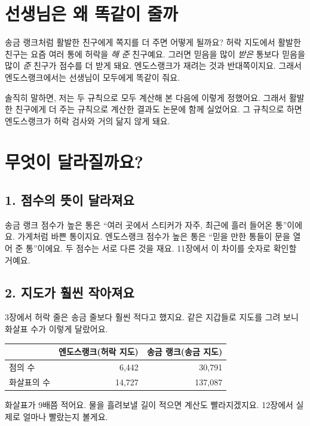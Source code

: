 \section{선생님은 왜 똑같이 줄까}

송금 랭크처럼 활발한 친구에게 쪽지를 더 주면 어떻게 될까요?
허락 지도에서 활발한 친구는 요즘 여러 통에 허락을 \emph{해 준} 친구예요.
그러면 믿음을 많이 \emph{받은} 통보다 믿음을 많이 \emph{준} 친구가 점수를 더 받게 돼요.
엔도스랭크가 재려는 것과 반대쪽이지요.
그래서 엔도스랭크에서는 선생님이 모두에게 똑같이 줘요.

솔직히 말하면, 저는 두 규칙으로 모두 계산해 본 다음에 이렇게 정했어요.
그래서 활발한 친구에게 더 주는 규칙으로 계산한 결과도 논문에 함께 실었어요.
그 규칙으로 하면 엔도스랭크가 허락 검사와 거의 닮지 않게 돼요.

\section{무엇이 달라질까요?}

\subsection*{1. 점수의 뜻이 달라져요}

송금 랭크 점수가 높은 통은 “여러 곳에서 스티커가 자주, 최근에 흘러 들어온 통”이에요.
가게처럼 바쁜 통이지요.
엔도스랭크 점수가 높은 통은 “믿을 만한 통들이 문을 열어 준 통”이에요.
두 점수는 서로 다른 것을 재요.
11장에서 이 차이를 숫자로 확인할 거예요.

\subsection*{2. 지도가 훨씬 작아져요}

3장에서 허락 줄은 송금 줄보다 훨씬 적다고 했지요.
같은 지갑들로 지도를 그려 보니 화살표 수가 이렇게 달랐어요.

\begin{center}
\small
\begin{tabular}{@{}lrr@{}}
\toprule
& 엔도스랭크(허락 지도) & 송금 랭크(송금 지도) \\
\midrule
점의 수 & 6,442 & 30,791 \\
화살표의 수 & 14,727 & 137,087 \\
\bottomrule
\end{tabular}
\end{center}

화살표가 9배쯤 적어요.
물을 흘려보낼 길이 적으면 계산도 빨라지겠지요.
12장에서 실제로 얼마나 빨랐는지 볼게요.

